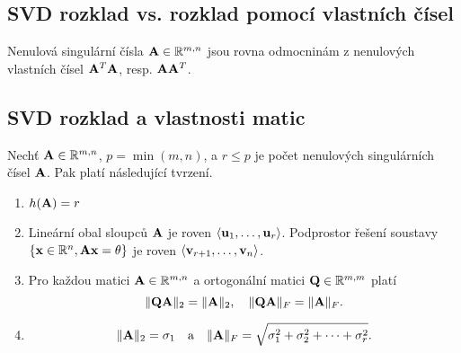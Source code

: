 \subsection*{SVD rozklad vs. rozklad pomocí vlastních čísel}

Nenulová singulární čísla $\mathbf{A} \in \mathbb{R}^{m,n}$ jsou rovna odmocninám z nenulových vlastních čísel $\mathbf{A}^T\mathbf{A}$, resp. $\mathbf{A}\mathbf{A}^T$.

\subsection*{SVD rozklad a vlastnosti matic}

Nechť $\mathbf{A} \in \mathbb{R}^{m,n}$, $p = \min(m,n)$, a $r \le p$ je počet nenulových singulárních čísel $\mathbf{A}$. Pak platí následující tvrzení.

\begin{enumerate}
	\item $h(\mathbf{A}) = r$
	\item Lineární obal sloupců $\mathbf{A}$ je roven $\langle \mathbf{u}_1,\dots,\mathbf{u}_r\rangle$.
	Podprostor řešení soustavy $\{\mathbf{x} \in \mathbb{R}^n, \mathbf{A} \mathbf{x} = \theta\}$ je roven $\langle \mathbf{v}_{r+1},\dots,\mathbf{v}_{n}\rangle$.
	\item Pro každou matici $\mathbf{A} \in \mathbb{R}^{m,n}$ a ortogonální matici $\mathbf{Q} \in \mathbb{R}^{m,m}$ platí
		\[ \|\mathbf{Q}\mathbf{A}\|_2 = \|\mathbf{A}\|_2, \quad \|\mathbf{Q}\mathbf{A}\|_F = \|\mathbf{A}\|_F. \]
	\item \[ \|\mathbf{A}\|_2 = \sigma_1 \quad \mbox{a} \quad \|\mathbf{A}\|_F = \sqrt{\sigma_1^2 + \sigma_2^2 + \dots + \sigma_r^2}. \]
\end{enumerate}

\pagebreak